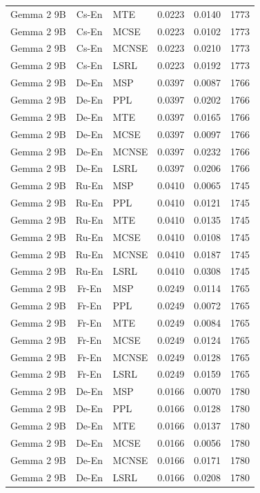 \begin{table}
\begin{tabular}{lc}
Gemma 2 9B & Cs-En & MTE & 0.0223 & 0.0140 & 1773 \\
Gemma 2 9B & Cs-En & MCSE & 0.0223 & 0.0102 & 1773 \\
Gemma 2 9B & Cs-En & MCNSE & 0.0223 & 0.0210 & 1773 \\
Gemma 2 9B & Cs-En & LSRL & 0.0223 & 0.0192 & 1773 \\
Gemma 2 9B & De-En & MSP & 0.0397 & 0.0087 & 1766 \\
Gemma 2 9B & De-En & PPL & 0.0397 & 0.0202 & 1766 \\
Gemma 2 9B & De-En & MTE & 0.0397 & 0.0165 & 1766 \\
Gemma 2 9B & De-En & MCSE & 0.0397 & 0.0097 & 1766 \\
Gemma 2 9B & De-En & MCNSE & 0.0397 & 0.0232 & 1766 \\
Gemma 2 9B & De-En & LSRL & 0.0397 & 0.0206 & 1766 \\
Gemma 2 9B & Ru-En & MSP & 0.0410 & 0.0065 & 1745 \\
Gemma 2 9B & Ru-En & PPL & 0.0410 & 0.0121 & 1745 \\
Gemma 2 9B & Ru-En & MTE & 0.0410 & 0.0135 & 1745 \\
Gemma 2 9B & Ru-En & MCSE & 0.0410 & 0.0108 & 1745 \\
Gemma 2 9B & Ru-En & MCNSE & 0.0410 & 0.0187 & 1745 \\
Gemma 2 9B & Ru-En & LSRL & 0.0410 & 0.0308 & 1745 \\
Gemma 2 9B & Fr-En & MSP & 0.0249 & 0.0114 & 1765 \\
Gemma 2 9B & Fr-En & PPL & 0.0249 & 0.0072 & 1765 \\
Gemma 2 9B & Fr-En & MTE & 0.0249 & 0.0084 & 1765 \\
Gemma 2 9B & Fr-En & MCSE & 0.0249 & 0.0124 & 1765 \\
Gemma 2 9B & Fr-En & MCNSE & 0.0249 & 0.0128 & 1765 \\
Gemma 2 9B & Fr-En & LSRL & 0.0249 & 0.0159 & 1765 \\
Gemma 2 9B & De-En & MSP & 0.0166 & 0.0070 & 1780 \\
Gemma 2 9B & De-En & PPL & 0.0166 & 0.0128 & 1780 \\
Gemma 2 9B & De-En & MTE & 0.0166 & 0.0137 & 1780 \\
Gemma 2 9B & De-En & MCSE & 0.0166 & 0.0056 & 1780 \\
Gemma 2 9B & De-En & MCNSE & 0.0166 & 0.0171 & 1780 \\
Gemma 2 9B & De-En & LSRL & 0.0166 & 0.0208 & 1780 \\

\end{tabular}
\end{table}
